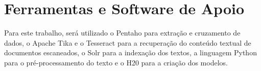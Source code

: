 

\section{Ferramentas e Software de Apoio}%

Para este trabalho, será utilizado o Pentaho para extração e cruzamento de dados, o Apache Tika e o Tesseract para a recuperação do conteúdo textual de documentos escaneados, o Solr para a indexação dos textos, a linguagem Python para o pré-processamento do texto e o H20 para a criação dos modelos.



